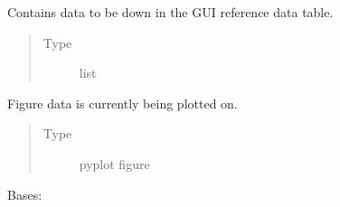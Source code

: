 \documentclass[a4paper,10pt,english]{sphinxmanual}
\begin{document}
\begin{fulllineitems}
\begin{fulllineitems}
\begin{quote}
\begin{description}
\end{description}\end{quote}

\end{fulllineitems}


\begin{fulllineitems}
\label{\detokenize{sfgtools:sfgtools.SFGProcessTools.reftabledata}}
\sphinxAtStartPar
Contains data to be down in the GUI reference data table.
\begin{quote}\begin{description}
\item[{Type}] \leavevmode
\sphinxAtStartPar
list

\end{description}\end{quote}

\end{fulllineitems}


\begin{fulllineitems}
\label{\detokenize{sfgtools:sfgtools.SFGProcessTools.current_figure}}
\sphinxAtStartPar
Figure data is currently being plotted on.
\begin{quote}\begin{description}
\item[{Type}] \leavevmode
\sphinxAtStartPar
pyplot figure

\end{description}\end{quote}

\end{fulllineitems}


\begin{fulllineitems}
\label{\detokenize{sfgtools:sfgtools.SFGProcessTools.SFGDataStore}}
\sphinxAtStartPar
Bases: 


\end{fulllineitems}
\end{fulllineitems}
\end{document}

